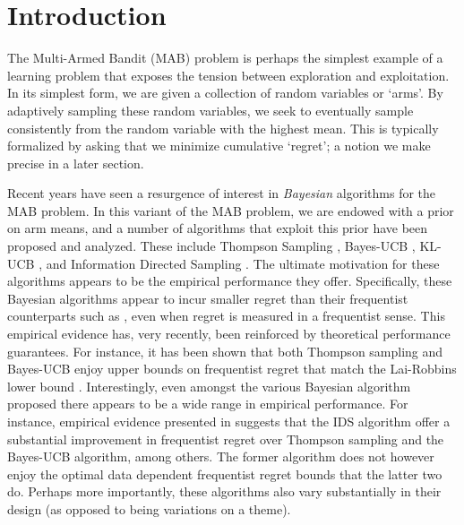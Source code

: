 \section{Introduction} \label{sec:intro}


The Multi-Armed Bandit (MAB) problem is perhaps the simplest example of a learning problem that exposes the tension between exploration and exploitation. In its simplest form, we are given a collection of random variables or `arms'. By adaptively sampling these random variables, we seek to eventually sample consistently from the random variable with the highest mean. This is typically formalized by asking that we minimize cumulative `regret'; a notion we make precise in a later section. 

Recent years have seen a resurgence of interest in {\em Bayesian} algorithms for the MAB problem. In this variant of the MAB problem, we are endowed with a prior on arm means, and a number of algorithms that exploit this prior have been proposed and analyzed. These include Thompson Sampling \citep{thompson1933likelihood}, Bayes-UCB \citep{kaufmann2012thompson}, KL-UCB \citep{garivier2011kl}, and Information Directed Sampling \citep{russo2014learning}. The ultimate motivation for these algorithms appears to be the empirical performance they offer. Specifically, these Bayesian algorithms appear to incur smaller regret than their frequentist counterparts such as \cite{auer2002finite}, even when regret is measured in a frequentist sense. This empirical evidence has, very recently, been reinforced by theoretical performance guarantees. For instance, it has been shown that both Thompson sampling and Bayes-UCB enjoy upper bounds on frequentist regret that match the Lai-Robbins lower bound \citep{lai1985asymptotically}. Interestingly, even amongst the various Bayesian algorithm proposed there appears to be a wide range in empirical performance. For instance, empirical evidence presented in \cite{russo2014learning} suggests that the IDS algorithm offer a substantial improvement in frequentist regret over Thompson sampling and the Bayes-UCB algorithm, among others. The former algorithm does not however enjoy the optimal data dependent frequentist regret bounds that the latter two do. Perhaps more importantly, these algorithms also vary substantially in their design (as opposed to being variations on a theme).    

